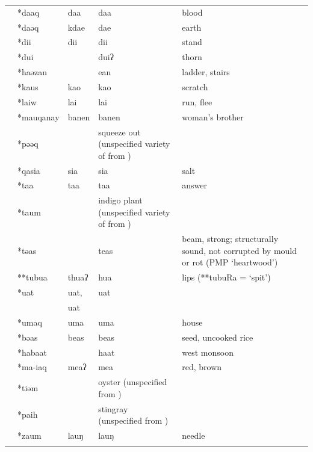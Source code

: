 {\begin{xltabular}[l]{\linewidth}{>{\hspace{-\tabcolsep}}l<{\hspace{-\tabcolsep}}>{\hspace{-\tabcolsep}\enspace}lll>{\raggedright\arraybackslash}X}
						&	*daaq				&	daa		&	daa		&	blood	\\
						&	*daəq				&	kdae		&	dae		&	earth	\\
						&	*dii					&	dii		&	dii		&	stand	\\
						&	*dui					&								&	duiʔ		&	thorn	\\
						&	*haəzan			&								&	ean		& ladder, stairs		\\
						&	*kaus				&	kao		&	kao		&	scratch	\\
						&	*laiw				&	lai		&	lai		&	run, flee	\\
						&	*mauqanay		&	b\tbr{l}anen	&	banen	&	woman's brother	\\
						&	*pəəq				&						&	squeeze out (unspecified variety of  from \citealt[169]{Jonker1908})	\\
						&	*qasia				&	sia		&	sia		&	salt	\\
						&	*taa					&	taa		&	taa		&	answer	\\
						&	*taum				&					&	indigo plant	(unspecified variety of  from \citealt[770]{Heyne1950})	\\
						&	*təas				&								&	teas		&	beam, strong; structurally sound, not corrupted by mould or rot (PMP `heartwood')	\\
						&	**tubua			&	thu\tbr{l}aʔ	&	hua		&	lips (**tubuRa = `spit')	\\
						&	*uat					&	uat, 	&	uat		&	\hp{\,}\\ \hhline{~}
						&	\hp{\,}							&	uat		&	\hp{\,}				&		\\ \midrule\hhline{~}
						&	*umaq				&	uma						&	uma						&	house	\\
						&	*bəas				&	beas					&	beas					&	seed, uncooked rice	\\
						&	*habaat			&								&	haat					&	west monsoon	\\
						&	*ma-iaq			&	meaʔ					&	mea						&	red, brown	\\
						& *tiəm				&									&	oyster (unspecified  from \citealt[629]{Jonker1908})	\\
						& *paih				&										&	stingray (unspecified  from \citealt[153]{Jonker1908})	\\
						&	*zaum				&	lauŋ					&	lauŋ					&	needle	\\
\lspbottomrule
\end{xltabular}\addtocounter{table}{-1}}

